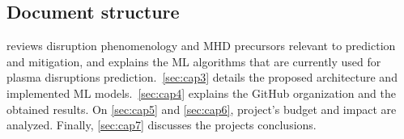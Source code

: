 \subsection{Document structure}

 reviews disruption phenomenology and MHD precursors relevant to prediction and mitigation, and explains the \ac{ML} algorithms that are currently used for plasma disruptions prediction.\ \autoref{sec:cap3} details the proposed architecture and implemented \ac{ML} models.\ \autoref{sec:cap4} explains the GitHub organization and the obtained results. On \autoref{sec:cap5} and \autoref{sec:cap6}, project's budget and impact are analyzed. Finally, \autoref{sec:cap7} discusses the projects conclusions.

